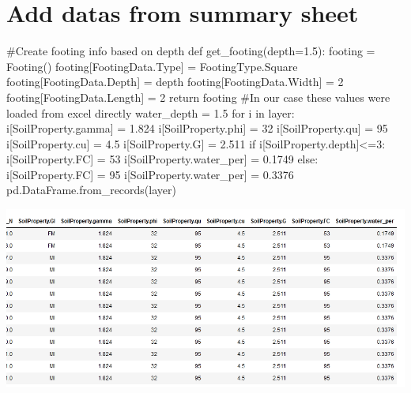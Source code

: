 \section{Add datas from summary sheet}
\begin{python}
#Create footing info based on depth
def get_footing(depth=1.5):
    footing = Footing()
    footing[FootingData.Type] = FootingType.Square
    footing[FootingData.Depth] = depth
    footing[FootingData.Width] = 2
    footing[FootingData.Length] = 2
    return footing
#In our case these values were loaded from excel directly
water_depth = 1.5
for i in layer:
    i[SoilProperty.gamma] = 1.824
    i[SoilProperty.phi] = 32
    i[SoilProperty.qu] = 95
    i[SoilProperty.cu] = 4.5
    i[SoilProperty.G] = 2.511
    if i[SoilProperty.depth]<=3:
        i[SoilProperty.FC] = 53
        i[SoilProperty.water_per] = 0.1749
    else:
        i[SoilProperty.FC] = 95
        i[SoilProperty.water_per] = 0.3376
pd.DataFrame.from_records(layer)
\end{python}
\includegraphics[width=\linewidth,keepaspectratio]{./images/sample/ass.png}\\\\

